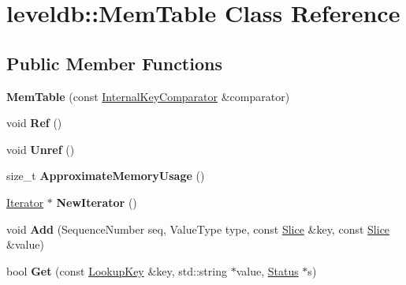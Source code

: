 \hypertarget{classleveldb_1_1_mem_table}{}\section{leveldb\+:\+:Mem\+Table Class Reference}
\label{classleveldb_1_1_mem_table}
\subsection*{Public Member Functions}
\begin{DoxyCompactItemize}
\item 
\mbox{\label{classleveldb_1_1_mem_table_a23add92a4a6e5d1521f3b6695dba5c2d}} 
{\bfseries Mem\+Table} (const \mbox{\hyperlink{classleveldb_1_1_internal_key_comparator}{Internal\+Key\+Comparator}} \&comparator)
\item 
\mbox{\label{classleveldb_1_1_mem_table_a332484cffd2ebc7d6a51f22eeeeeb71b}} 
void {\bfseries Ref} ()
\item 
\mbox{\label{classleveldb_1_1_mem_table_a5dcbf17d1477e6098a30dadd0745cfb2}} 
void {\bfseries Unref} ()
\item 
\mbox{\label{classleveldb_1_1_mem_table_a667a1ada274201f0bdd3615baf1bd882}} 
size\+\_\+t {\bfseries Approximate\+Memory\+Usage} ()
\item 
\mbox{\label{classleveldb_1_1_mem_table_a396b8ba5e2ea0de25b666026f3b9235f}} 
\mbox{\hyperlink{classleveldb_1_1_iterator}{Iterator}} $\ast$ {\bfseries New\+Iterator} ()
\item 
\mbox{\label{classleveldb_1_1_mem_table_a37bec80954badb2354426aa175e9371f}} 
void {\bfseries Add} (Sequence\+Number seq, Value\+Type type, const \mbox{\hyperlink{classleveldb_1_1_slice}{Slice}} \&key, const \mbox{\hyperlink{classleveldb_1_1_slice}{Slice}} \&value)
\item 
\mbox{\label{classleveldb_1_1_mem_table_af94f80a5909a440d0675afa68f8765c5}} 
bool {\bfseries Get} (const \mbox{\hyperlink{classleveldb_1_1_lookup_key}{Lookup\+Key}} \&key, std\+::string $\ast$value, \mbox{\hyperlink{classleveldb_1_1_status}{Status}} $\ast$s)
\end{DoxyCompactItemize}
